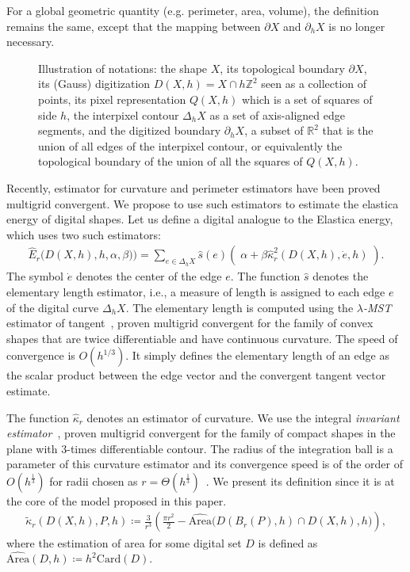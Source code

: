\documentclass{siamart220329}
\newcommand{\R}{\mathbb{R}}
\newcommand{\Z}{\mathbb{Z}}
\newcommand{\digset}{D} %
\begin{document}
For a global geometric quantity (e.g. perimeter, area, volume), the definition
remains the same, except that the mapping between $\partial X$ and $\partial_h
X$ is no longer necessary.

\begin{figure}
  
  \caption{
   Illustration of notations: the shape $X$, its topological boundary $\partial
   X$, its (Gauss) digitization $D(X,h)=X \cap h \Z^2$ seen as a collection of
   points, its pixel representation $Q(X,h)$ which is a set of squares of side
   $h$, the interpixel contour $\Delta_h X$ as a set of axis-aligned edge
   segments, and the digitized boundary $\partial_h X$, a subset of $\R^2$ that
   is the union of all edges of the interpixel contour, or equivalently the
   topological boundary of the union of all the squares of
   $Q(X,h)$.\label{fig-notations}}
\end{figure}

Recently, estimator for curvature and perimeter estimators have been proved
multigrid convergent. We propose to use such estimators to estimate the elastica
energy of digital shapes. Let us define a digital analogue to the Elastica
energy, which uses two such estimators:
%
%
\begin{align}
    \hat{E}_r\big( D(X,h),h,\alpha,\beta) \big) = \sum_{e \in \Delta_h X}{
    \hat{s}(e)\left(\; \alpha + \beta \hat{\kappa}_{r}^2(D(X,h),\dot{e},h)
    \; \right)}.
	\label{eq:digital-energy}
\end{align}
%
%
The symbol $\dot{e}$ denotes the center of the edge $e$.  The function $\hat{s}$
denotes the elementary length estimator, i.e., a measure of length is assigned
to each edge $e$ of the digital curve $\Delta_h X$. The elementary length is
computed using the \emph{$\lambda$-MST} estimator of
tangent~\cite{lachaud07tangent,lachaud06hdr}, proven multigrid convergent for
the family of convex shapes that are twice differentiable and have continuous
curvature. The speed of convergence is $O(h^{1/3})$. It simply defines the
elementary length of an edge as the scalar product between the edge vector and
the convergent tangent vector estimate.

The function $\hat{\kappa} _r$ denotes an estimator of curvature. We use the
integral \emph{invariant estimator}~\cite{coeurjolly13integral}, proven
multigrid convergent for the family of compact shapes in the plane with
$3$-times differentiable contour. The radius of the integration ball is a
parameter of this curvature estimator and its convergence speed is of the order
of $O(h^{\frac{1}{3}})$ for radii chosen as $r=\Theta
(h^{\frac{1}{3}})$~\cite{lachaud2017robust}. We present its definition since it
is at the core of the model proposed in this paper.
%
%
\begin{align}
  \tilde{\kappa}_r(D(X,h),P,h) \coloneqq \frac{3}{r^3}\left( \frac{\pi r^2}{2} -
  \widehat{\text{Area}}\big( D(B_r(P),h) \cap D(X,h),h\big) \right),
  \label{eq:curvature_approximation}
\end{align}
%
%
where the estimation of area for some digital set $\digset$ is defined as
$\widehat{\text{Area}}(\digset,h) \coloneqq h^2\text{Card}\left( \digset \right).$ 
\end{document}
